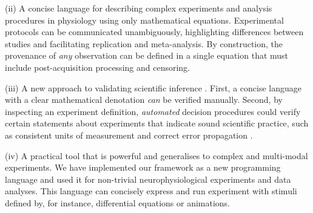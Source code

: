 (ii) A concise language for describing complex experiments and
analysis procedures in physiology using only mathematical
equations. Experimental protocols can be communicated unambiguously,
highlighting differences between studies and facilitating replication
and meta-analysis.  By construction, the provenance
\citep{Pool2002,MacKenzie-Graham2008, VanHorn2009} of \emph{any}
observation can be defined in a single equation that must include
post-acquisition processing and censoring.

(iii) A new approach to validating scientific inference
\citep{Editors2003, Editors2010}. First, a concise language with a
clear mathematical denotation \emph{can} be verified manually. Second, by
inspecting an experiment definition, \emph{automated} decision procedures
could verify certain statements about experiments that indicate sound
scientific practice, such as consistent units of measurement
\citep{Kennedy1997} and correct error propagation \citep{Taylor1997}.

(iv) A practical tool that is powerful and generalises to complex and
multi-modal experiments. We have implemented our framework as a new
programming language and used it for non-trivial neurophysiological
experiments and data analyses. This language can concisely express and
run experiment with stimuli defined by, for instance, differential
equations or animations.
